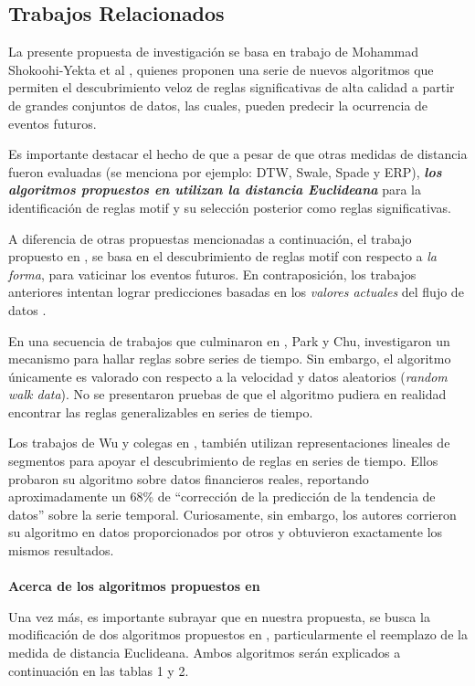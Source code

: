 \subsection{Trabajos Relacionados}
La presente propuesta de investigaci\'on se basa en trabajo de Mohammad Shokoohi-Yekta et al \cite{main}, quienes proponen una serie de nuevos algoritmos que permiten el des\-cubrimiento veloz de reglas significativas de alta calidad a partir de grandes conjuntos de datos, las cuales, pueden predecir la ocurrencia de eventos futuros.\par
Es importante destacar el hecho de que a pesar de que otras medidas de distancia fueron evaluadas (se menciona por ejemplo: DTW, Swale, Spade y ERP), \textit{\textbf{los algoritmos propuestos en \cite{main} utilizan la distancia Euclideana}} para la identificaci\'on de reglas motif y su selecci\'on posterior como reglas significativas.\par
A diferencia de otras propuestas mencionadas a continuaci\'on, el trabajo propuesto en \cite{main}, se basa en el descubrimiento de reglas motif con respecto a \textit{la forma}, para vaticinar los eventos futuros. En contraposici\'on, los trabajos anteriores intentan lograr predicciones basadas en los \textit{valores actuales} del flujo de datos \cite{others}.\par
En una secuencia de trabajos que culminaron en \cite{elasticrules}, Park y Chu, investigaron un mecanismo para hallar reglas sobre series de tiempo. Sin embargo, el algoritmo \'unicamente es valorado con respecto a la velocidad y datos aleatorios (\textit{random walk data}). No se presentaron pruebas de que el algoritmo pudiera en realidad encontrar las reglas generalizables en series de tiempo.\par
Los trabajos de Wu y colegas en \cite{eventdriven}, tambi\'en utilizan representaciones lineales de segmentos para apoyar el descubrimiento de reglas en series de tiempo. Ellos probaron su algoritmo sobre datos financieros reales, reportando aproximadamente un 68\% de \enquote{correcci\'on de la predicci\'on de la tendencia de datos} sobre la serie temporal. Curiosamente, sin embargo, los autores corrieron su algoritmo en datos proporcionados por otros y obtuvieron exactamente los mismos resultados.\\\\
\textbf{Acerca de los algoritmos propuestos en \cite{main}}\par
Una vez m\'as, es importante subrayar que en nuestra propuesta, se busca la modi\-ficaci\'on de dos algoritmos propuestos en \cite{main}, particularmente el reemplazo de la medida de distancia Euclideana. Ambos algoritmos ser\'an explicados a continuaci\'on en las tablas 1 y 2.\par
